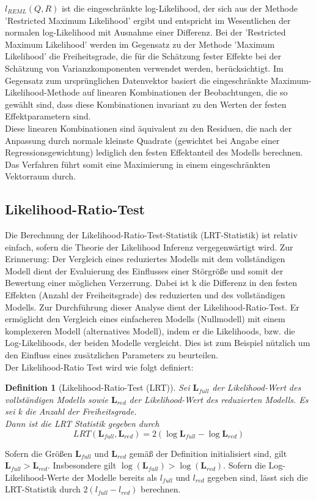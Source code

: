 \documentclass[%
thesis=student,%
coverpage=false,%
titlepage=false,%
headmarks=true, %
german,%
font=libertine, %
math=newpxtx, %
BCOR=5mm,%
coverBCOR=11mm%
]{tumbook}
\theoremstyle{break}
\newtheorem{definition}{Definition}[section]
\begin{document}
$l_{REML}(Q,R)$ ist die eingeschränkte log-Likelihood, der sich aus der Methode 'Restricted Maximum Likelihood' ergibt und entspricht im Wesentlichen der normalen log-Likelihood mit Ausnahme einer Differenz. Bei der 'Restricted Maximum Likelihood' werden im Gegensatz zu der Methode 'Maximum Likelihood' die Freiheitsgrade, die für die Schätzung fester Effekte bei der Schätzung von Varianzkomponenten verwendet werden, berücksichtigt. Im Gegensatz zum ursprünglichen Datenvektor basiert die eingeschränkte Maximum-Likelihood-Methode auf linearen Kombinationen der Beobachtungen, die so gewählt sind, dass diese Kombinationen invariant zu den Werten der festen Effektparametern sind. \\
Diese linearen Kombinationen sind äquivalent zu den Residuen, die nach der Anpassung durch normale kleinste Quadrate (gewichtet bei Angabe einer Regressionsgewichtung) lediglich den festen Effektanteil des Modells berechnen. Das Verfahren führt somit eine Maximierung in einem eingeschränkten Vektorraum durch.
\subsection{Likelihood-Ratio-Test}
Die Berechnung der Likelihood-Ratio-Test-Statistik (LRT-Statistik) ist relativ einfach, sofern die Theorie der Likelihood Inferenz vergegenwärtigt wird. Zur Erinnerung: Der Vergleich eines reduziertes Modells mit dem vollständigen Modell dient der Evaluierung des Einflusses einer Störgröße und somit der Bewertung einer möglichen Verzerrung. Dabei ist k die Differenz in den festen Effekten (Anzahl der Freiheitsgrade) des reduzierten und des vollständigen Modells. Zur Durchführung dieser Analyse dient der Likelihood-Ratio-Test. Er ermöglicht den Vergleich eines einfacheren Modells (Nullmodell) mit einem komplexeren Modell (alternatives Modell), indem er die Likelihoods, bzw. die Log-Likelihoods, der beiden Modelle vergleicht. Dies ist zum Beispiel nützlich um den Einfluss eines zusätzlichen Parameters zu beurteilen. \\
Der Likelihood-Ratio Test wird wie folgt definiert:\\
\begin{definition}[Likelihood-Ratio-Test (LRT)] 
	Sei $\mathbf{L}_{full}$ der Likelihood-Wert des vollständigen Modells sowie $\mathbf{L}_{red}$ der Likelihood-Wert des reduzierten Modells. Es sei k die Anzahl der Freiheitsgrade.\\
	Dann ist die LRT Statistik gegeben durch 
	$$ LRT(\mathbf{L}_{full}, \mathbf{L}_{red}) = 2(\log \mathbf{L}_{full}- \log \mathbf{L}_{red}) $$ 
\end{definition} \noindent
Sofern die Größen $\mathbf{L}_{full}$ und $\mathbf{L}_{red}$ gemäß der Definition initialisiert sind, gilt $\mathbf{L}_{full} > \mathbf{L}_{red}$. Insbesondere gilt $\log(\mathbf{L}_{full}) > \log(\mathbf{L}_{red})$.
Sofern die Log-Likelihood-Werte der Modelle bereits als $l_{full}$ und $l_{red}$ gegeben sind, lässt sich die LRT-Statistik durch $2(l_{full} - l_{red})$ berechnen. \\
\\
\end{document}

